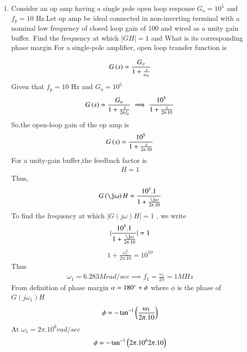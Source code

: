 \begin{enumerate}[label=\thesubsection.\arabic*.,ref=\thesubsection.\theenumi]

\item Consider an op amp having a single pole open loop response $G_{o} = 10^5$ and $f_{p} = 10$ Hz.Let op amp be ideal connected in non-inverting terminal with a nominal low frequency of closed loop gain of 100 and wired as a unity gain buffer.
\subitem Find the frequency at which $|GH| = 1$ and 
What is its corresponding phase margin
\solution  
For a single-pole amplifier, open loop transfer function is 

\begin{align}
    G\left(s\right) = \frac{G_{o}}{1+\frac{s}{\omega_{p}}}
\end{align}
Given that $f_{p} = 10$ Hz and $G_{o} =10^5$
\begin{align}
G\left(s\right)=\frac{G_{o}}{1+\frac{s}{2\pi f_{p}}}
\implies \frac{10^{5}}{1+\frac{s}{2\pi.10}}
\end{align}
So,the open-loop gain of the op amp is 
\begin{align}
    G\left(s\right)=\frac{10^{5}}{1+\frac{s}{2\pi.10}}
\end{align}
For a unity-gain buffer,the feedback factor is
\begin{align}
    H = 1
\end{align}
Thus, 
\begin{align}
    G\brak{\j\omega}H = \frac{10^{5}.1}{1+\frac{\j\omega}{2\pi.10}}
\end{align}
To find the frequency at which $|G(j\omega)H|=1$ , we write
\begin{align}
    |\frac{10^{5}.1}{1+\frac{\j\omega}{2\pi.10}}| = 1
\end{align}
\begin{align}
    {1+\frac{\omega_{1}^2}{2\pi.10}} = 10^{10}
\end{align}
Thus  
\begin{align}
    \omega_{1} = 6.283 Mrad/sec
\implies f_{1} =\frac{\omega_{1}}{2\pi}=1 MHz
\end{align}
From definition of phase margin $\alpha = 180\degree + \phi$
where $\phi$ is the phase of $G(j\omega_{1})H$
\begin{align}
\phi = -\tan^{-1}\brak{\frac{\omega_{1}}{2\pi.10}}
\label{eq:ee18btech11012_phaseGH}
\end{align}
At $\omega_{1} = 2\pi.10^{6}rad/sec$
\begin{align}
    \phi = -\tan^{-1}\brak{{2\pi.10^{6}}{2\pi.10}}

\end{align}
\end{enumerate}
